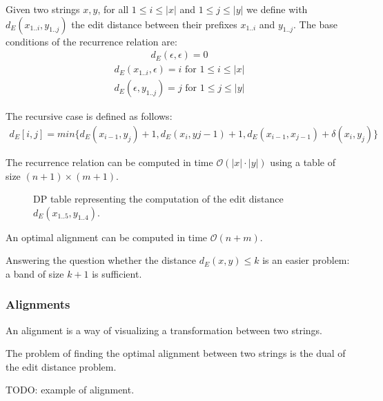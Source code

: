 Given two strings $x,y$, for all $1 \leq i \leq \left| x \right|$ and $1 \leq j \leq \left| y \right|$ we define with $d_E(x_{1..i},y_{1..j})$ the edit distance between their prefixes $x_{1..i}$ and $y_{1..j}$.
The base conditions of the recurrence relation are:
\begin{eqnarray}
d_E(\epsilon,\epsilon) = 0
\end{eqnarray}
\begin{eqnarray}
d_E(x_{1..i},\epsilon) = i \text{ for } 1 \leq i \leq \left| x \right|
\end{eqnarray}
\begin{eqnarray}
d_E(\epsilon, y_{1..j}) = j \text{ for } 1 \leq j \leq \left| y \right|
\end{eqnarray}

The recursive case is defined as follows:
\begin{eqnarray}
d_E[i,j] = min \{ d_E(x_{i-1},y_j)+1, d_E(x_i,y{j-1})+1, d_E(x_{i-1},x_{j-1}) + \delta(x_i, y_j)\}
\end{eqnarray}

The recurrence relation can be computed in time $\mathcal{O}(\left| x \right| \cdot \left| y \right|)$ using a table of size $(n+1) \times (m+1)$.

\begin{figure}[h]
\caption{DP table representing the computation of the edit distance $d_E(x_{1..5}, y_{1..4})$.}
\label{fig:edit-dp}
\end{figure}

An optimal alignment can be computed in time $\mathcal{O}(n + m)$.

Answering the question whether the distance $d_E(x,y) \leq k$ is an easier problem: a band of size $k+1$ is sufficient.

\subsubsection{Alignments}

An alignment is a way of visualizing a transformation between two strings.

The problem of finding the optimal alignment between two strings is the dual of the edit distance problem.

\begin{example}
TODO: example of alignment.
\end{example}


